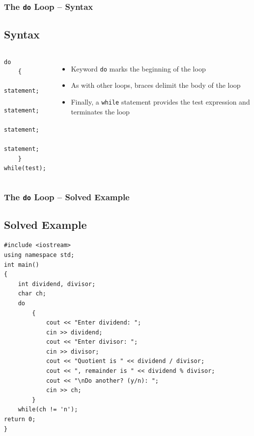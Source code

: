 \documentclass{beamer}
\begin{document}
\begin{frame}[fragile]
    \frametitle{The \texttt{do} Loop -- Syntax}
    \subsection{Syntax} %
    \label{sub:do_syntax}
    \begin{columns}
        \lstset{style=mystyle}
\begin{lstlisting}
do
    {
       statement;
       statement;
       statement;
       statement;
    }
while(test);
\end{lstlisting}
            \begin{itemize}
            \item Keyword \texttt{do} marks the beginning of the loop
            \item As with other loops, braces delimit the body of the loop
            \item Finally, a \texttt{while} statement provides the test expression and terminates the loop
            \end{itemize}
    \end{columns}
\end{frame}

\begin{frame} [fragile]
    \frametitle{The \texttt{do} Loop -- Solved Example}
    \subsection{Solved Example} %
    \label{sub:do_solved_example}
    \lstset{style=mystyle}
    \begin{lstlisting}
#include <iostream>
using namespace std;
int main()
{
    int dividend, divisor;
    char ch;
    do
        {
            cout << "Enter dividend: ";
            cin >> dividend;
            cout << "Enter divisor: ";
            cin >> divisor;
            cout << "Quotient is " << dividend / divisor;
            cout << ", remainder is " << dividend % divisor;
            cout << "\nDo another? (y/n): ";
            cin >> ch;
        }
    while(ch != 'n');
return 0;
}
\end{lstlisting}
\end{frame}
\end{document}
